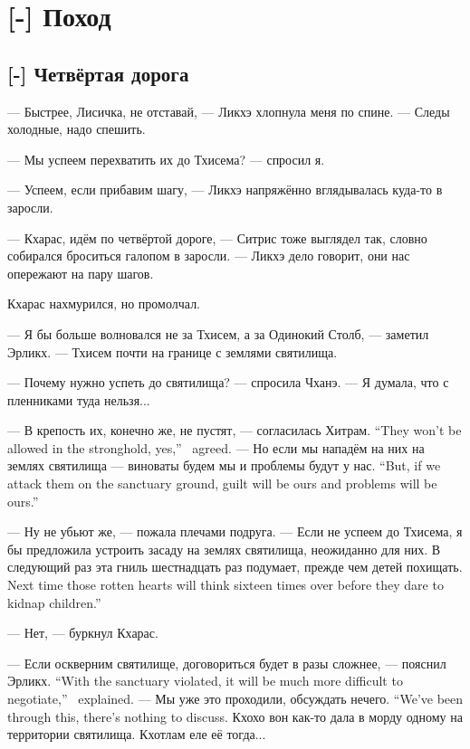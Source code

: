 \chapter{[-] Поход}

\section{[-] Четвёртая дорога}

--- Быстрее, Лисичка, не отставай, --- Ликхэ хлопнула меня по спине.
--- Следы холодные, надо спешить.

--- Мы успеем перехватить их до Тхисема? --- спросил я.

--- Успеем, если прибавим шагу, --- Ликхэ напряжённо вглядывалась куда-то в заросли.

--- Кхарас, идём по четвёртой дороге, --- Ситрис тоже выглядел так, словно собирался броситься галопом в заросли.
--- Ликхэ дело говорит, они нас опережают на пару шагов.

Кхарас нахмурился, но промолчал.

--- Я бы больше волновался не за Тхисем, а за Одинокий Столб, --- заметил Эрликх.
--- Тхисем почти на границе с землями святилища.

--- Почему нужно успеть до святилища? --- спросила Чханэ.
--- Я думала, что с пленниками туда нельзя...

{--- В крепость их, конечно же, не пустят, --- согласилась Хитрам.}
{``They won't be allowed in the stronghold, yes,'' \Chitram\ agreed.}
{--- Но если мы нападём на них на землях святилища --- виноваты будем мы и проблемы будут у нас.}
{``But, if we attack them on the sanctuary ground, guilt will be ours and problems will be ours.''}

--- Ну не убьют же, --- пожала плечами подруга.
--- Если не успеем до Тхисема, я бы предложила устроить засаду на землях святилища, неожиданно для них.
{В следующий раз эта гниль шестнадцать раз подумает, прежде чем детей похищать.}
{Next time those rotten hearts will think sixteen times over before they dare to kidnap children.''}

--- Нет, --- буркнул Кхарас.

{--- Если оскверним святилище, договориться будет в разы сложнее, --- пояснил Эрликх.}
{``With the sanctuary violated, it will be much more difficult to negotiate,'' \Oerlikch\ explained.}
{--- Мы уже это проходили, обсуждать нечего.}
{``We've been through this, there's nothing to discuss.}
Кхохо вон как-то дала в морду одному на территории святилища.
Кхотлам еле её тогда...

